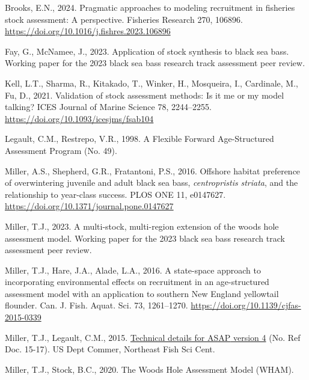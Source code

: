 \documentclass[
]{article}
\newlength{\cslhangindent}
\newlength{\cslentryspacingunit} %
\newenvironment{CSLReferences}[2] %
 {%
  \setlength{\parindent}{0pt}
  \ifodd #1
  \let\oldpar\par
  \def\par{\hangindent=\cslhangindent\oldpar}
  \fi
  \setlength{\parskip}{#2\cslentryspacingunit}
 }%
 {}
\begin{document}
\hypertarget{refs}{}
\begin{CSLReferences}{1}{0}
\leavevmode{}%
Brooks, E.N., 2024. Pragmatic approaches to modeling recruitment in fisheries stock assessment: A perspective. Fisheries Research 270, 106896. \url{https://doi.org/10.1016/j.fishres.2023.106896}

\leavevmode{}%
Fay, G., McNamee, J., 2023. Application of stock synthesis to black sea bass. Working paper for the 2023 black sea bass research track assessment peer review.

\leavevmode{}%
Kell, L.T., Sharma, R., Kitakado, T., Winker, H., Mosqueira, I., Cardinale, M., Fu, D., 2021. Validation of stock assessment methods: Is it me or my model talking? ICES Journal of Marine Science 78, 2244--2255. \url{https://doi.org/10.1093/icesjms/fsab104}

\leavevmode{}%
Legault, C.M., Restrepo, V.R., 1998. A {Flexible Forward Age}-{Structured Assessment Program} (No. 49).

\leavevmode{}%
Miller, A.S., Shepherd, G.R., Fratantoni, P.S., 2016. Offshore habitat preference of overwintering juvenile and adult black sea bass, \emph{centropristis} \emph{striata}, and the relationship to year-class success. {PLOS} {ONE} 11, e0147627. \url{https://doi.org/10.1371/journal.pone.0147627}

\leavevmode{}%
Miller, T.J., 2023. A multi-stock, multi-region extension of the woods hole assessment model. Working paper for the 2023 black sea bass research track assessment peer review.

\leavevmode{}%
Miller, T.J., Hare, J.A., Alade, L.A., 2016. A state-space approach to incorporating environmental effects on recruitment in an age-structured assessment model with an application to southern {New England} yellowtail flounder. Can. J. Fish. Aquat. Sci. 73, 1261--1270. \url{https://doi.org/10.1139/cjfas-2015-0339}

\leavevmode{}%
Miller, T.J., Legault, C.M., 2015. \href{https://doi:10.7289/V57W695G}{Technical details for {ASAP} version 4} (No. Ref Doc. 15-17). {US Dept Commer, Northeast Fish Sci Cent}.

\leavevmode{}%
Miller, T.J., Stock, B.C., 2020. The {Woods Hole Assessment Model} ({WHAM}).


\end{CSLReferences}
\end{document}
